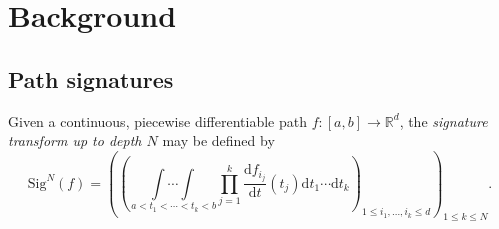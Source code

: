 \documentclass{article}
\newcommand{\reals}{\mathbb{R}}
\newcommand{\sig}{\mathrm{Sig}^N}
\begin{document}
\section{Background}

%

\subsection{Path signatures}

Given a continuous, piecewise differentiable path $f \colon [a, b] \to
\reals^d$, the \emph{signature transform up to depth $N$} may be defined
by
%
\begin{equation}
    \sig(f)=\left(\left(\underset{\,a<t_{1}<\cdots<t_{k}<b}{\int \cdots \int} \prod_{j=1}^{k} \frac{\mathrm{d} f_{i_{j}}}{\mathrm{d} t}\left(t_{j}\right) \mathrm{d} t_{1} \cdots \mathrm{d} t_{k}\right)_{1 \leq i_{1}, \ldots, i_{k} \leq d}\right)_{1 \leq k \leq N}.
\end{equation}


\end{document}
